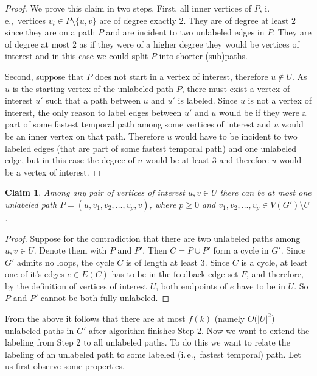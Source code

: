 \documentclass[11pt,a4paper]{article}
\newtheorem{claim}[theorem]{Claim}
\theoremstyle{remark}
\theoremstyle{definition}
\newcommand{\ie}{i.\,e.,\ }
\begin{document}
\begin{proof}
    We prove this claim in two steps.
    First, all inner vertices of $P$, \ie vertices $v_i \in P \setminus \{u,v\}$ are of degree exactly $2$. They are of degree at least $2$ since they are on a path $P$ and are incident to two unlabeled edges in  $P$.
    They are of degree at most $2$ as if they were of a higher degree they would be vertices of interest and in this case we could split $P$ into shorter (sub)paths.
    
    Second, suppose that $P$ does not start in a vertex of interest, therefore $u \notin U$. As $u$ is the starting vertex of the unlabeled path $P$, there must exist a vertex of interest $u'$ such that a path between $u$ and $u'$ is labeled.
    Since $u$ is not a vertex of interest, the only reason to label edges between $u'$ and $u$ would be if they were a part of some fastest temporal path among some vertices of interest and $u$ would be an inner vertex on that path.
    Therefore $u$ would have to be incident to two labeled edges (that are part of some fastest temporal path) and one unlabeled edge, but in this case the degree of $u$ would be at least $3$ and therefore $u$ would be a vertex of interest.
\end{proof}

\begin{claim}
    Among any pair of vertices of interest $u,v \in U$ there can be at most one unlabeled path $P = (u, v_1, v_2, \dots, v_p, v)$, where $p \geq 0$ and $v_1,v_2,\dots,v_p \in V(G') \setminus U$.
\end{claim}
\begin{proof}
    Suppose for the contradiction that there are two unlabeled paths among $u,v \in U$.
    Denote them with $P$ and $P'$. 
    Then $C = P \cup P'$ form a cycle in $G'$. Since $G'$ admits no loops, the cycle $C$ is of length at least $3$.
   Since $C$ is a cycle, at least one of it's edges $e \in E(C)$ has to be in the feedback edge set $F$, and therefore, by the definition of vertices of interest $U$, 
   both endpoints of $e$ have to be in $U$.
   So $P$ and $P'$ cannot be both fully unlabeled.
\end{proof}

From the above it follows that there are at most $f(k)$ (namely $O(|U|^2$) unlabeled paths in $G'$ after algorithm finishes Step 2.
Now we want to extend the labeling from Step 2 to all unlabeled paths.
To do this we want to relate the labeling of an unlabeled path to some labeled (\ie fastest temporal) path.
Let us first observe some properties.
\end{document}
